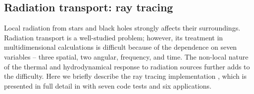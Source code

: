 \subsection{Radiation transport: ray tracing}
\label{sec.num.raytracing}

Local radiation from stars and black holes strongly affects their
surroundings.  Radiation transport is a well-studied problem; however,
its treatment in multidimensional calculations is difficult because of
the dependence on seven variables -- three spatial, two angular,
frequency, and time.  The non-local nature of the thermal and
hydrodynamical response to radiation sources further adds to the
difficulty.  Here we briefly describe the ray tracing implementation \moray,
which is presented in full detail in \citet{Wise11_Moray} with seven
code tests and six applications.


